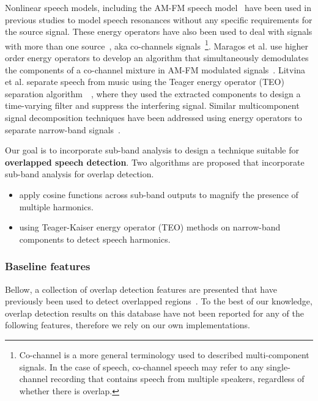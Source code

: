 Nonlinear speech models, including the AM-FM speech model~\cite{maragos_kaiser_quatieri} have been used in previous studies to model speech resonances without any specific requirements for the source signal. 
These energy operators have also been used to deal with signals with more than one source~\cite{maragos_instantaneousenergy}, aka co-channels signals~\footnote{Co-channel is a more general terminology used to described multi-component signals. 
In the case of speech, co-channel speech may refer to any single-channel recording that contains speech from multiple speakers, regardless of whether there is overlap.}. 
Maragos et al. use higher order energy operators to develop an algorithm that simultaneously demodulates the components of a co-channel mixture in AM-FM modulated signals~\cite{maragos_instantaneousenergy}. 
Litvina et al. separate speech from music using the Teager energy operator (TEO) separation algorithm~\cite{maragos_kaiser_quatieri}~\cite{Litvin2010}, where they used the extracted components to design a time-varying filter and suppress the interfering signal. 
Similar multicomponent signal decomposition techniques have been addressed using energy operators to separate narrow-band signals~\cite{Linicassp95,hu12_nullspacepersuit,santhanam_maragos_2000}. 

Our goal is to incorporate sub-band analysis to design a technique suitable for {\bf overlapped speech detection}. 
Two algorithms are proposed that incorporate sub-band analysis for overlap detection. 
\begin{itemize}
	\item apply cosine functions across sub-band outputs to magnify the presence of multiple harmonics. 
	\item using Teager-Kaiser energy operator (TEO) methods on narrow-band components to detect speech harmonics. 
\end{itemize}



\subsubsection{Baseline features}
Bellow, a collection of overlap detection features are presented that have previously been used to detect overlapped regions~\cite{nav_icassp13,boakye_thesis,sapvr_2000}. 
To the best of our knowledge, overlap detection results on this database have not been reported for any of the following features, therefore we rely on our own implementations. %

